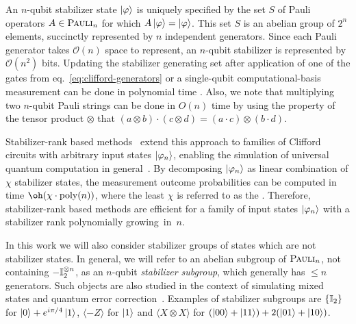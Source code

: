 An $n$-qubit stabilizer state $\ket{\phi}$ is uniquely specified by the set $S$ of Pauli operators $A \in \Pauli_n$ for which $A\ket{\phi} = \ket{\phi}$.
This set $S$ is an abelian group of $2^n$ elements, succinctly represented by $n$ independent generators.
Since each Pauli generator takes $\mathcal{O}(n)$ space to represent, an $n$-qubit stabilizer is represented by $\mathcal O(n^2)$ bits.
Updating the stabilizer generating set after application of one of the gates from eq.~\eqref{eq:clifford-generators} or a single-qubit computational-basis measurement can be done in polynomial time \cite{gottesman1998heisenberg}.
Also, we note that multiplying two $n$-qubit Pauli strings can be done in $O(n)$ time by using the property of the tensor product $\otimes$ that $(a\otimes b) \cdot (c\otimes d) = (a\cdot c) \otimes (b\cdot d)$.

Stabilizer-rank based methods~\cite{bravyi2016trading,bravyi2017improved,bravyi2019simulation, huang2019approximate,kocia2018stationary,kocia2020improved} extend this approach to families of Clifford circuits with arbitrary input states $\ket{\phi_n}$, enabling the simulation of universal quantum computation in general~\cite{bravyi2005universal}.
By decomposing $\ket{\phi_n}$ as linear combination of $\chi$ stabilizer states, the measurement outcome probabilities can be computed in time $\oh(\chi \cdot \textnormal{poly}(n))$, where the least $\chi$ is referred to as the .
Therefore, stabilizer-rank based methods are efficient for a family of input states $\ket{\phi_n}$ with a stabilizer rank polynomially growing~in~$n$.

In this work we will also consider stabilizer groups of states which are not stabilizer states.
In general, we will refer to an abelian subgroup of $\Pauli_n$, not containing $-\id[2]^{\otimes n}$, as an $n$-qubit \emph{stabilizer subgroup}, which generally has $\leq n$ generators.
Such objects are also studied in the context of simulating mixed states \cite{audenaert2005entanglement} and quantum error correction~\cite{gottesman1997stabilizer}.
Examples of stabilizer subgroups are $\{\id[2]\}$ for $\ket{0} + e^{i\pi/4}\ket{1}$, $\langle -Z\rangle$ for $\ket{1}$ and $\langle X \otimes X\rangle$ for $(\ket{00} + \ket{11}) + 2(\ket{01} + \ket{10})$.

